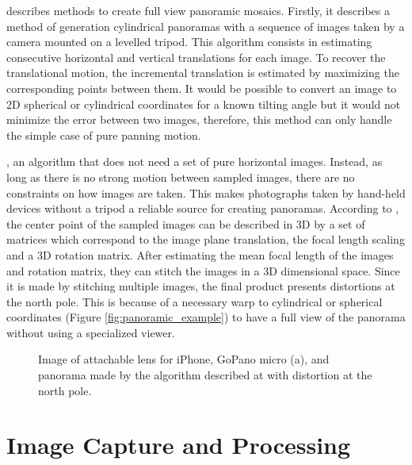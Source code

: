\citeauthor{Szeliski} \cite{Szeliski} describes methods to create full view panoramic mosaics. Firstly, it describes a method of generation cylindrical panoramas with a sequence of images taken by a camera mounted on a levelled tripod. This algorithm consists in estimating consecutive horizontal and vertical translations for each image. To recover the translational motion, the incremental translation is estimated by maximizing the corresponding points between them. It would be possible to convert an image to 2D spherical or cylindrical coordinates for a known tilting angle but it would not minimize the error between two images, therefore, this method can only handle the simple case of pure panning motion.

\citeauthor{Szeliski} \cite{Szeliski}, an algorithm that does not need a set of pure horizontal images. Instead, as long as there is no strong motion between sampled images, there are no constraints on how images are taken. This makes photographs taken by hand-held devices without a tripod a reliable source for creating panoramas. According to \citeauthor{Szeliski}, the center point of the sampled images can be described in 3D by a set of matrices which correspond to the image plane translation, the focal length scaling and a 3D rotation matrix. After estimating the mean focal length of the images and rotation matrix, they can stitch the images in a 3D dimensional space.
Since it is made by stitching multiple images, the final product presents distortions at the north pole. This is because of a necessary warp to cylindrical or spherical coordinates (Figure \ref{fig:panoramic_example}) to have a full view of the panorama without using a specialized viewer.

\begin{figure}[htbp]
        \centering
  \caption{Image of attachable lens for iPhone, GoPano micro (a), and panorama made by the algorithm described at \citeauthor{Szeliski} \cite{Szeliski} with distortion at the north pole.}
  \label{fig:panoramic_image}
\end{figure}


\section{Image Capture and Processing}
\label{sub:capturing_processing}


